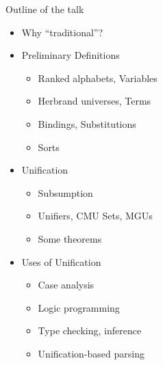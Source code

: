 \documentclass[pdf,fyma2]{prosper} %
\newcommand{\unhilight}[1]{{\color{gris2}#1}}
\begin{document}
\begin{slide}{Outline of the talk}
	\begin{itemize}
	\item \unhilight{Why ``traditional''?}
	\item \unhilight{Preliminary Definitions}
	    \begin{itemize}
    	\item \unhilight{Ranked alphabets, Variables}
    	\item \unhilight{Herbrand universes, Terms}
    	\item \unhilight{Bindings, Substitutions}
    	\item \unhilight{Sorts}
    	\end{itemize}
	\item Unification
	    \begin{itemize}
    	\item Subsumption
    	\item Unifiers, CMU Sets, MGUs
    	\item Some theorems
    	\end{itemize}
	\item \unhilight{Uses of Unification}
	    \begin{itemize}
    	\item \unhilight{Case analysis}
    	\item \unhilight{Logic programming}
    	\item \unhilight{Type checking, inference}
    	\item \unhilight{Unification-based parsing}
    	\end{itemize}
	\end{itemize}
\end{slide}
\end{document}
